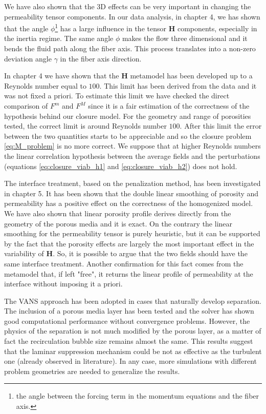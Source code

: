 We have also shown that the 3D effects can be very important in changing the permeability tensor components. In our data analysis, in chapter 4, we has shown that the angle $\phi$\footnote{the angle between the forcing term in the momentum equations and the fiber axis.} has a large influence in the tensor $\mathbf{H}$ components, especially in the inertia regime.
The same angle $\phi$ makes the flow three dimensional and it bends the fluid path along the fiber axis. This process translates into a non-zero deviation angle $\gamma$ in the fiber axis direction.

In chapter 4 we have shown that the $\mathbf{H}$ metamodel has been developed up to a Reynolds number equal to $100$. This limit has been derived from the data and it was not fixed a priori. To estimate this limit we have checked the direct comparison of $F^m$ and $F^M$ since it is a fair estimation of the correctness of the hypothesis behind our closure model. For the geometry and range of porosities tested, the correct limit is around Reynolds number $100$. After this limit the error between the two quantities starts to be appreciable and so the closure problem \eqref{eq:M_problem} is no more correct. We suppose that at higher Reynolds numbers the linear correlation hypothesis between the average fields and the perturbations (equations \eqref{eq:closure_viab_h1} and \eqref{eq:closure_viab_h2}) does not hold.

The interface treatment, based on the penalization method, has been investigated in chapter 5. It has been shown that the double linear smoothing of porosity and permeability has a positive effect on the correctness of the homogenized model. We have also shown that linear porosity profile derives directly from the geometry of the porous media and it is exact. On the contrary the linear smoothing for the permeability tensor is purely heuristic, but it can be supported by the fact that the porosity effects are largely the most important effect in the variability of $\mathbf{H}$. So, it is possible to argue that the two fields should have the same interface treatment. Another confirmation for this fact comes from the metamodel that, if left "free", it returns the linear profile of permeability at the interface without imposing it a priori.
 
The VANS approach has been adopted in cases that naturally develop separation. The inclusion of a porous media layer has been tested and the solver has shown good computational performance without convergence problems. However, the physics of the separation is not much modified by the porous layer, as a matter of fact the recirculation bubble size remains almost the same. This results suggest that the laminar suppression mechanism could be not as effective as the turbulent one (already observed in literature). In any case, more simulations with different problem geometries are needed to generalize the results.

